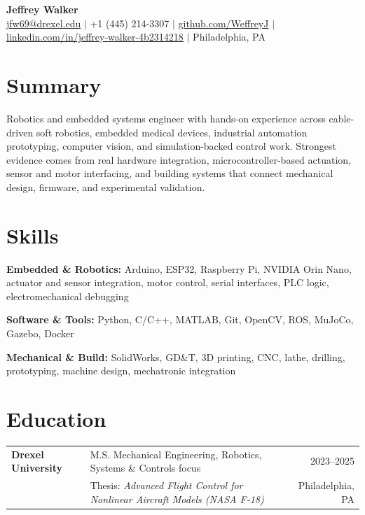 \documentclass[10pt,letterpaper]{article}
\begin{document}
\begin{center}
    {\LARGE \textbf{Jeffrey Walker}}\\[0.28em]
    \href{mailto:jfw69@drexel.edu}{jfw69@drexel.edu}
    \quad $|$ \quad
    +1 (445) 214-3307
    \quad $|$ \quad
    \href{https://github.com/WeffreyJ}{github.com/WeffreyJ}
    \quad $|$ \quad
    \href{https://www.linkedin.com/in/jeffrey-walker-4b2314218/}{linkedin.com/in/jeffrey-walker-4b2314218}
    \quad $|$ \quad
    Philadelphia, PA
\end{center}

\section*{Summary}

Robotics and embedded systems engineer with hands-on experience across cable-driven soft robotics, embedded medical devices, industrial automation prototyping, computer vision, and simulation-backed control work. Strongest evidence comes from real hardware integration, microcontroller-based actuation, sensor and motor interfacing, and building systems that connect mechanical design, firmware, and experimental validation.

\section{Skills}

\textbf{Embedded \& Robotics:} Arduino, ESP32, Raspberry Pi, NVIDIA Orin Nano, actuator and sensor integration, motor control, serial interfaces, PLC logic, electromechanical debugging

\textbf{Software \& Tools:} Python, C/C++, MATLAB, Git, OpenCV, ROS, MuJoCo, Gazebo, Docker

\textbf{Mechanical \& Build:} SolidWorks, GD\&T, 3D printing, CNC, lathe, drilling, prototyping, machine design, mechatronic integration

\section{Education}

\begin{tabularx}{\textwidth}{@{}l Y r@{}}
\textbf{Drexel University} & M.S. Mechanical Engineering, Robotics, Systems \& Controls focus & 2023--2025 \\
& Thesis: \textit{Advanced Flight Control for Nonlinear Aircraft Models (NASA F-18)} & Philadelphia, PA
\end{tabularx}
\end{document}
